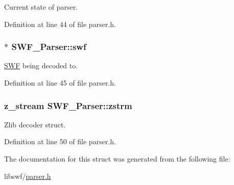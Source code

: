 Current state of parser. 



Definition at line 44 of file parser.\-h.

\hypertarget{struct_s_w_f___parser_a89022933c95956b746307de9714197da}{
\subsubsection[{swf}]{$\ast$ S\-W\-F\-\_\-\-Parser\-::swf}}\label{struct_s_w_f___parser_a89022933c95956b746307de9714197da}


\hyperlink{struct_s_w_f}{S\-W\-F} being decoded to. 



Definition at line 45 of file parser.\-h.

\hypertarget{struct_s_w_f___parser_adbcdea5d290997995b3924c361f9fb43}{
\subsubsection[{zstrm}]{\setlength{\rightskip}{0pt plus 5cm}z\-\_\-stream S\-W\-F\-\_\-\-Parser\-::zstrm}}\label{struct_s_w_f___parser_adbcdea5d290997995b3924c361f9fb43}


Zlib decoder struct. 



Definition at line 50 of file parser.\-h.



The documentation for this struct was generated from the following file\-:\begin{DoxyCompactItemize}
\item 
libswf/\hyperlink{parser_8h}{parser.\-h}\end{DoxyCompactItemize}
